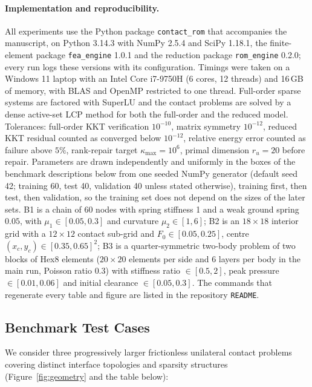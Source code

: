 \documentclass[11pt,a4paper]{article}
\begin{document}
\paragraph{Implementation and reproducibility.}
All experiments use the Python package \texttt{contact\_rom} that accompanies the manuscript, on Python 3.14.3 with NumPy 2.5.4 and SciPy 1.18.1, the finite-element package \texttt{fea\_engine} 1.0.1 and the reduction package \texttt{rom\_engine} 0.2.0; every run logs these versions with its configuration. Timings were taken on a Windows 11 laptop with an Intel Core i7-9750H (6 cores, 12 threads) and 16\,GB of memory, with BLAS and OpenMP restricted to one thread. Full-order sparse systems are factored with SuperLU \cite{demmel1999supernodal} and the contact problems are solved by a dense active-set LCP method for both the full-order and the reduced model. Tolerances: full-order KKT verification $10^{-10}$, matrix symmetry $10^{-12}$, reduced KKT residual counted as converged below $10^{-12}$, relative energy error counted as failure above $5\%$, rank-repair target $\kappa_{\max} = 10^{6}$, primal dimension $r_u = 20$ before repair. Parameters are drawn independently and uniformly in the boxes of the benchmark descriptions below from one seeded NumPy generator (default seed 42; training 60, test 40, validation 40 unless stated otherwise), training first, then test, then validation, so the training set does not depend on the sizes of the later sets. B1 is a chain of 60 nodes with spring stiffness 1 and a weak ground spring $0.05$, with $\mu_1 \in [0.05, 0.3]$ and curvature $\mu_2 \in [1, 6]$; B2 is an $18\times18$ interior grid with a $12\times12$ contact sub-grid and $F_0 \in [0.05, 0.25]$, centre $(x_c, y_c) \in [0.35, 0.65]^2$; B3 is a quarter-symmetric two-body problem of two blocks of Hex8 elements ($20\times20$ elements per side and 6 layers per body in the main run, Poisson ratio $0.3$) with stiffness ratio $\in [0.5, 2]$, peak pressure $\in [0.01, 0.06]$ and initial clearance $\in [0.05, 0.3]$. The commands that regenerate every table and figure are listed in the repository \texttt{README}.

\hypertarget{benchmark-test-cases}{%
\subsection{Benchmark Test Cases}\label{benchmark-test-cases}}

We consider three progressively larger frictionless unilateral contact problems covering distinct interface topologies and sparsity structures (Figure~\ref{fig:geometry} and the table below):
\end{document}
